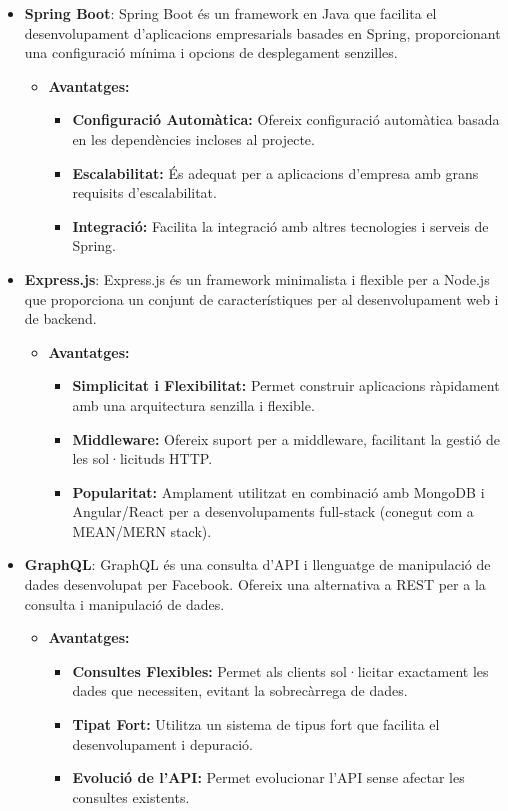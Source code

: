 \documentclass[a4paper,12pt,twoside]{ThesisStyle}
\begin{document}
\begin{itemize}
    \item \textbf{Spring Boot}: Spring Boot és un framework en Java que facilita el desenvolupament d'aplicacions empresarials basades en Spring, proporcionant una configuració mínima i opcions de desplegament senzilles.
    \begin{itemize}
        \item \textbf{Avantatges:}
        \begin{itemize}
            \item \textbf{Configuració Automàtica:} Ofereix configuració automàtica basada en les dependències incloses al projecte.
            \item \textbf{Escalabilitat:} És adequat per a aplicacions d’empresa amb grans requisits d'escalabilitat.
            \item \textbf{Integració:} Facilita la integració amb altres tecnologies i serveis de Spring.
        \end{itemize}
    \end{itemize}

    \item \textbf{Express.js}: Express.js és un framework minimalista i flexible per a Node.js que proporciona un conjunt de característiques per al desenvolupament web i de backend.
    \begin{itemize}
        \item \textbf{Avantatges:}
        \begin{itemize}
            \item \textbf{Simplicitat i Flexibilitat:} Permet construir aplicacions ràpidament amb una arquitectura senzilla i flexible.
            \item \textbf{Middleware:} Ofereix suport per a middleware, facilitant la gestió de les sol·licituds HTTP.
            \item \textbf{Popularitat:} Amplament utilitzat en combinació amb MongoDB i Angular/React per a desenvolupaments full-stack (conegut com a MEAN/MERN stack).
        \end{itemize}
    \end{itemize}


    \item \textbf{GraphQL}: GraphQL és una consulta d'API i llenguatge de manipulació de dades desenvolupat per Facebook. Ofereix una alternativa a REST per a la consulta i manipulació de dades.
    \begin{itemize}
        \item \textbf{Avantatges:}
        \begin{itemize}
            \item \textbf{Consultes Flexibles:} Permet als clients sol·licitar exactament les dades que necessiten, evitant la sobrecàrrega de dades.
            \item \textbf{Tipat Fort:} Utilitza un sistema de tipus fort que facilita el desenvolupament i depuració.
            \item \textbf{Evolució de l'API:} Permet evolucionar l'API sense afectar les consultes existents.
        \end{itemize}
    \end{itemize}
\end{itemize}
\end{document}
